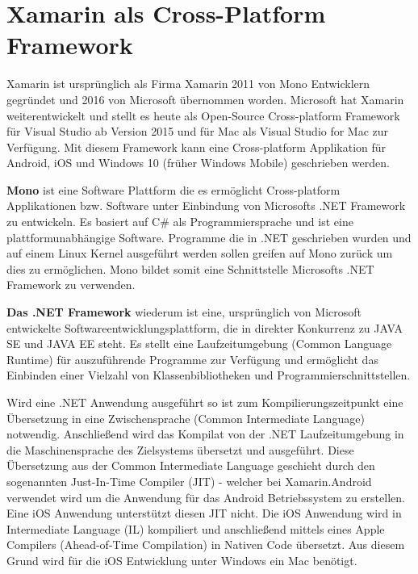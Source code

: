 %
%
% 
% 


\chapter{Xamarin als Cross-Platform Framework}
\label{chap:xamarin}
	Xamarin ist ursprünglich als Firma Xamarin 2011 von Mono Entwicklern gegründet und 2016 von Microsoft übernommen worden. Microsoft hat Xamarin weiterentwickelt und stellt es heute als Open-Source Cross-platform Framework für Visual Studio ab Version 2015 und für Mac als Visual Studio for Mac zur Verfügung. Mit diesem Framework kann eine Cross-platform Applikation für Android, iOS und Windows 10 (früher Windows Mobile) geschrieben werden.

	\textbf{Mono} ist eine Software Plattform die es ermöglicht Cross-platform Applikationen bzw. Software unter Einbindung von Microsofts .NET Framework zu entwickeln. Es basiert auf C\# als Programmiersprache und ist eine plattformunabhängige Software. Programme die in .NET geschrieben wurden und auf einem Linux Kernel ausgeführt werden sollen greifen auf Mono zurück um dies zu ermöglichen. Mono bildet somit eine Schnittstelle Microsofts .NET Framework zu verwenden.

	\textbf{Das .NET Framework} wiederum ist eine, ursprünglich von Microsoft entwickelte Softwareentwicklungsplattform, die in direkter Konkurrenz zu JAVA SE und JAVA EE steht. Es stellt eine Laufzeitumgebung (Common Language Runtime) für auszuführende Programme zur Verfügung und ermöglicht das Einbinden einer Vielzahl von Klassenbibliotheken und Programmierschnittstellen.

	Wird eine .NET Anwendung ausgeführt so ist zum Kompilierungszeitpunkt eine Übersetzung in eine Zwischensprache (Common Intermediate Language) notwendig. Anschließend wird das Kompilat von der .NET Laufzeitumgebung in die Maschinensprache des Zielsystems übersetzt und ausgeführt. Diese Übersetzung aus der Common Intermediate Language geschieht durch den sogenannten Just-In-Time Compiler (JIT) - welcher bei Xamarin.Android verwendet wird um die Anwendung für das Android Betriebssystem zu erstellen. Eine iOS Anwendung unterstützt diesen JIT nicht. Die iOS Anwendung wird in Intermediate Language (IL) kompiliert und anschließend mittels eines Apple Compilers (Ahead-of-Time Compilation) in Nativen Code übersetzt. Aus diesem Grund wird für die iOS Entwicklung unter Windows ein Mac benötigt.

